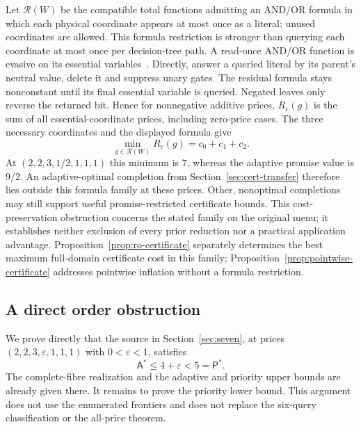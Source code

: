 \documentclass[pdflatex,sn-mathphys-num]{sn-jnl}
\newcommand{\A}{\mathsf{A}}
\newcommand{\Pcost}{\mathsf{P}}
\theoremstyle{thmstyleone}
\theoremstyle{thmstylethree}
\theoremstyle{thmstyletwo}
\begin{document}
Let $\mathcal R(W)$ be the compatible total functions admitting an AND/OR formula in which each physical coordinate appears at most once as a literal; unused coordinates are allowed. This formula restriction is stronger than querying each coordinate at most once per decision-tree path. A read-once AND/OR function is evasive on its essential variables~\cite{charikar02}. Directly, answer a queried literal by its parent's neutral value, delete it and suppress unary gates. The residual formula stays nonconstant until its final essential variable is queried. Negated leaves only reverse the returned bit. Hence for nonnegative additive prices, $R_c(g)$ is the sum of all essential-coordinate prices, including zero-price cases. The three necessary coordinates and the displayed formula give
\[
 \min_{g\in\mathcal R(W)}R_c(g)=c_0+c_1+c_2.
\]
At $(2,2,3,1/2,1,1,1)$ this minimum is $7$, whereas the adaptive promise value is $9/2$. An adaptive-optimal completion from Section~\ref{sec:cert-transfer} therefore lies outside this formula family at these prices. Other, nonoptimal completions may still support useful promise-restricted certificate bounds. This cost-preservation obstruction concerns the stated family on the original menu; it establishes neither exclusion of every prior reduction nor a practical application advantage. Proposition~\ref{prop:ro-certificate} separately determines the best maximum full-domain certificate cost in this family; Proposition~\ref{prop:pointwise-certificate} addresses pointwise inflation without a formula restriction.

\subsection{A direct order obstruction}
\label{app:order-obstruction}

We prove directly that the source in Section~\ref{sec:seven}, at prices
$(2,2,3,\varepsilon,1,1,1)$ with $0<\varepsilon<1$, satisfies
\[
 \A^*\le 4+\varepsilon<5=\Pcost^*.
\]
The complete-fibre realization and the adaptive and priority upper bounds
are already given there. It remains to prove the priority lower bound.
This argument does not use the enumerated frontiers and does not replace
the six-query classification or the all-price theorem.
\end{document}
